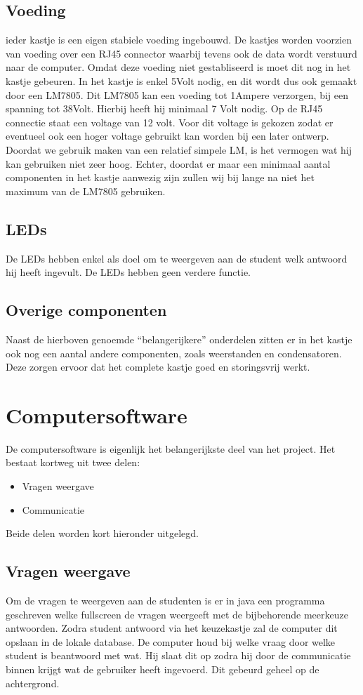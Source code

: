 \subsection{Voeding}
\In ieder kastje is een eigen stabiele voeding ingebouwd. De kastjes worden voorzien van voeding over een RJ45 connector waarbij tevens ook de data wordt verstuurd naar de computer. Omdat deze voeding niet gestabliseerd is moet dit nog in het kastje gebeuren. In het kastje is enkel 5Volt nodig, en dit wordt dus ook gemaakt door een LM7805. Dit LM7805 kan een voeding tot 1Ampere verzorgen, bij een spanning tot 38Volt. Hierbij heeft hij minimaal 7 Volt nodig. Op de RJ45 connectie staat een voltage van 12 volt. Voor dit voltage is gekozen zodat er eventueel ook een hoger voltage gebruikt kan worden bij een later ontwerp. Doordat we gebruik maken van een relatief simpele LM, is het vermogen wat hij kan gebruiken niet zeer hoog. Echter, doordat er maar een minimaal aantal componenten in het kastje aanwezig zijn zullen wij bij lange na niet het maximum van de LM7805 gebruiken. 

\subsection{LEDs}
De LEDs hebben enkel als doel om te weergeven aan de student welk antwoord hij heeft ingevult. De LEDs hebben geen verdere functie.

\subsection{Overige componenten}
Naast de hierboven genoemde ``belangerijkere'' onderdelen zitten er in het kastje ook nog een aantal andere componenten, zoals weerstanden en condensatoren. Deze zorgen ervoor dat het complete kastje goed en storingsvrij werkt. 

\section{Computersoftware}
De computersoftware is eigenlijk het belangerijkste deel van het project. Het bestaat kortweg uit twee delen:
\begin{itemize}
  \item Vragen weergave
  \item Communicatie
\end{itemize}
Beide delen worden kort hieronder uitgelegd.

\subsection{Vragen weergave}
Om de vragen te weergeven aan de studenten is er in java een programma geschreven welke fullscreen de vragen weergeeft met de bijbehorende meerkeuze antwoorden. Zodra  student antwoord via het keuzekastje zal de computer dit opslaan in de lokale database. De computer houd bij welke vraag door welke student is beantwoord met wat. Hij slaat dit op zodra hij door de communicatie binnen krijgt wat de gebruiker heeft ingevoerd. Dit gebeurd geheel op de achtergrond.

